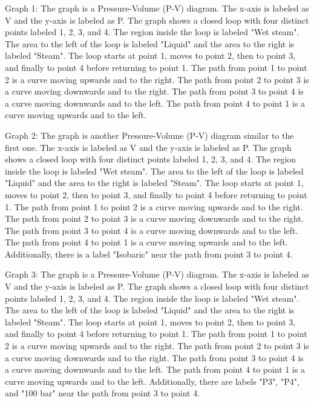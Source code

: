 Graph 1:
The graph is a Pressure-Volume (P-V) diagram. The x-axis is labeled as V and the y-axis is labeled as P. The graph shows a closed loop with four distinct points labeled 1, 2, 3, and 4. The region inside the loop is labeled "Wet steam". The area to the left of the loop is labeled "Liquid" and the area to the right is labeled "Steam". The loop starts at point 1, moves to point 2, then to point 3, and finally to point 4 before returning to point 1. The path from point 1 to point 2 is a curve moving upwards and to the right. The path from point 2 to point 3 is a curve moving downwards and to the right. The path from point 3 to point 4 is a curve moving downwards and to the left. The path from point 4 to point 1 is a curve moving upwards and to the left.

Graph 2:
The graph is another Pressure-Volume (P-V) diagram similar to the first one. The x-axis is labeled as V and the y-axis is labeled as P. The graph shows a closed loop with four distinct points labeled 1, 2, 3, and 4. The region inside the loop is labeled "Wet steam". The area to the left of the loop is labeled "Liquid" and the area to the right is labeled "Steam". The loop starts at point 1, moves to point 2, then to point 3, and finally to point 4 before returning to point 1. The path from point 1 to point 2 is a curve moving upwards and to the right. The path from point 2 to point 3 is a curve moving downwards and to the right. The path from point 3 to point 4 is a curve moving downwards and to the left. The path from point 4 to point 1 is a curve moving upwards and to the left. Additionally, there is a label "Isobaric" near the path from point 3 to point 4.

Graph 3:
The graph is a Pressure-Volume (P-V) diagram. The x-axis is labeled as V and the y-axis is labeled as P. The graph shows a closed loop with four distinct points labeled 1, 2, 3, and 4. The region inside the loop is labeled "Wet steam". The area to the left of the loop is labeled "Liquid" and the area to the right is labeled "Steam". The loop starts at point 1, moves to point 2, then to point 3, and finally to point 4 before returning to point 1. The path from point 1 to point 2 is a curve moving upwards and to the right. The path from point 2 to point 3 is a curve moving downwards and to the right. The path from point 3 to point 4 is a curve moving downwards and to the left. The path from point 4 to point 1 is a curve moving upwards and to the left. Additionally, there are labels "P3", "P4", and "100 bar" near the path from point 3 to point 4.